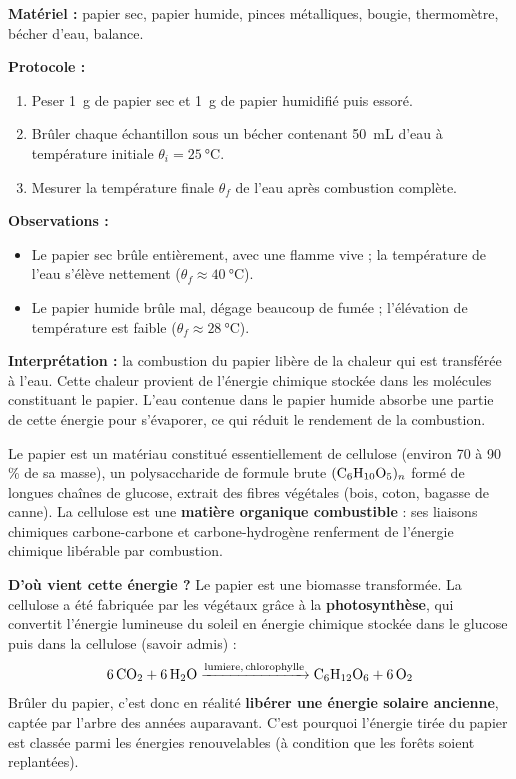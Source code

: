 \documentclass[11pt]{article}
\newcommand{\cle}[1]{{\popxbold\color{popdark}#1}}
\begin{document}
\begin{experience}
\textbf{Matériel :} papier sec, papier humide, pinces métalliques, bougie, thermomètre, bécher d'eau, balance.

\textbf{Protocole :}
\begin{enumerate}
\item Peser \SI{1}{g} de papier sec et \SI{1}{g} de papier humidifié puis essoré.
\item Brûler chaque échantillon sous un bécher contenant \SI{50}{mL} d'eau à température initiale $\theta_i = \SI{25}{\celsius}$.
\item Mesurer la température finale $\theta_f$ de l'eau après combustion complète.
\end{enumerate}

\textbf{Observations :}
\begin{itemize}
\item Le papier sec brûle entièrement, avec une flamme vive ; la température de l'eau s'élève nettement ($\theta_f \approx \SI{40}{\celsius}$).
\item Le papier humide brûle mal, dégage beaucoup de fumée ; l'élévation de température est faible ($\theta_f \approx \SI{28}{\celsius}$).
\end{itemize}

\textbf{Interprétation :} la combustion du papier libère de la chaleur qui est transférée à l'eau. Cette chaleur provient de l'\cle{énergie chimique} stockée dans les molécules constituant le papier. L'eau contenue dans le papier humide absorbe une partie de cette énergie pour s'évaporer, ce qui réduit le rendement de la combustion.
\end{experience}

\begin{definition}
Le \cle{papier} est un matériau constitué essentiellement de \cle{cellulose} (environ 70 à 90 \% de sa masse), un polysaccharide de formule brute $(\ce{C6H10O5})_n$ formé de longues chaînes de glucose, extrait des fibres végétales (bois, coton, bagasse de canne). La cellulose est une \textbf{matière organique combustible} : ses liaisons chimiques carbone-carbone et carbone-hydrogène renferment de l'énergie chimique libérable par combustion.
\end{definition}

\textbf{D'où vient cette énergie ?} Le papier est une \cle{biomasse transformée}. La cellulose a été fabriquée par les végétaux grâce à la \textbf{photosynthèse}, qui convertit l'énergie lumineuse du soleil en énergie chimique stockée dans le glucose puis dans la cellulose (savoir admis) :
\[ \ce{6CO2 + 6H2O ->[lumiere, chlorophylle] C6H12O6 + 6O2} \]
Brûler du papier, c'est donc en réalité \textbf{libérer une énergie solaire ancienne}, captée par l'arbre des années auparavant. C'est pourquoi l'énergie tirée du papier est classée parmi les \cle{énergies renouvelables} (à condition que les forêts soient replantées).
\end{document}
